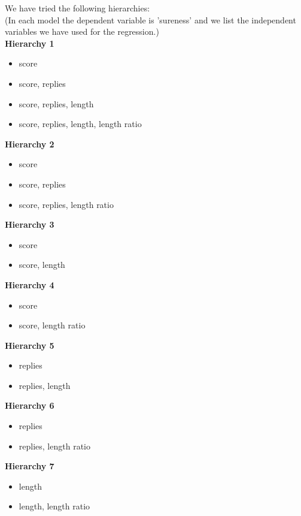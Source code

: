 \documentclass[11pt, oneside]{article}   	%
\begin{document}
We have tried the following hierarchies:\\
(In each model the dependent variable is 'sureness' and we list the independent variables we have used for the regression.)\\

\textbf{Hierarchy 1}
\begin{itemize}
    \item score
    \item score, replies
    \item score, replies, length
    \item score, replies, length, length ratio
\end{itemize}

\textbf{Hierarchy 2}
\begin{itemize}
    \item score
    \item score, replies
    \item score, replies, length ratio
\end{itemize}

\textbf{Hierarchy 3}
\begin{itemize}
    \item score
    \item score, length
\end{itemize}

\textbf{Hierarchy 4}
\begin{itemize}
    \item score
    \item score, length ratio
\end{itemize}

\textbf{Hierarchy 5}
\begin{itemize}
    \item replies
    \item replies, length
\end{itemize}

\textbf{Hierarchy 6}
\begin{itemize}
    \item replies
    \item replies, length ratio
\end{itemize}

\textbf{Hierarchy 7}
\begin{itemize}
    \item length
    \item length, length ratio
\end{itemize}
\end{document}
